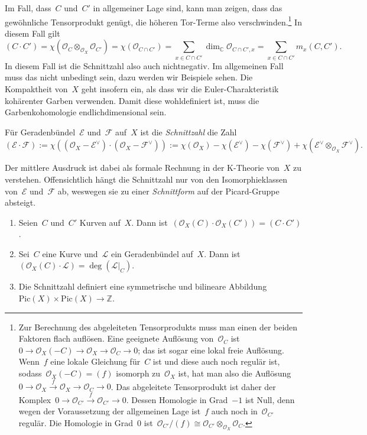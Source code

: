 \documentclass[a4paper,ngerman,12pt]{scrartcl}
\theoremstyle{definition}
\theoremstyle{plain}
\theoremstyle{remark}
\newcommand{\CC}{\mathbb{C}}
\newcommand{\ZZ}{\mathbb{Z}}
\newcommand{\E}{\mathcal{E}}
\newcommand{\F}{\mathcal{F}}
\renewcommand{\L}{\mathcal{L}}
\renewcommand{\O}{\mathcal{O}}
\newcommand{\Pic}{\mathrm{Pic}}
\begin{document}
Im Fall, dass~$C$ und~$C'$ in allgemeiner Lage sind, kann man zeigen, dass das
gewöhnliche Tensorprodukt genügt, die höheren Tor-Terme also
verschwinden.\footnote{Zur Berechnung des abgeleiteten Tensorprodukts muss man
einen der beiden Faktoren flach auflösen. Eine geeignete Auflösung von~$\O_C$
ist~$0 \to \O_X(-C) \to \O_X \to \O_C \to 0$; das ist sogar eine lokal freie
Auflösung. Wenn~$f$ eine lokale Gleichung für~$C$ ist und diese auch noch
regulär ist, sodass~$\O_X(-C) = (f)$ isomorph zu~$\O_X$ ist, hat man also die
Auflösung~$0 \to \O_X \stackrel{f}{\to} \O_X \to \O_C \to 0$. Das abgeleitete
Tensorprodukt ist daher der Komplex~$0 \to \O_{C'} \stackrel{f}{\to} \O_{C'}
\to 0$. Dessen Homologie in Grad~$-1$ ist Null, denn wegen der Voraussetzung
der allgemeinen Lage ist~$f$ auch noch in~$\O_{C'}$ regulär. Die Homologie in
Grad~$0$ ist~$\O_{C'}/(f) \cong \O_{C'} \otimes_{\O_X} \O_C$.}
In diesem Fall gilt
\[ (C \cdot C') = \chi(\O_C \otimes_{\O_X} \O_{C'}) = \chi(\O_{C \cap C'}) =
  \sum_{x \in C \cap C'} \dim_\CC \O_{C \cap C',x} =
  \sum_{x \in C \cap C'} m_x(C,C'). \]
In diesem Fall ist die Schnittzahl also auch nichtnegativ. Im allgemeinen Fall
muss das nicht unbedingt sein, dazu werden wir Beispiele sehen. Die Kompaktheit
von~$X$ geht insofern ein, als dass wir die Euler-Charakteristik kohärenter
Garben verwenden. Damit diese wohldefiniert ist, muss die Garbenkohomologie
endlichdimensional sein.

\begin{defn}Für Geradenbündel~$\E$ und~$\F$ auf~$X$ ist die \emph{Schnittzahl}
die Zahl
\[ (\E \cdot \F) :=
  \chi((\O_X - \E^\vee) \cdot (\O_X - \F^\vee)) :=
  \chi(\O_X) - \chi(\E^\vee) - \chi(\F^\vee) + \chi(\E^\vee \otimes_{\O_X}
  \F^\vee). \]
\end{defn}
Der mittlere Ausdruck ist dabei als formale Rechnung in der K-Theorie von~$X$
zu verstehen. Offensichtlich hängt die Schnittzahl nur von den
Isomorphieklassen von~$\E$ und~$\F$ ab, weswegen sie zu einer
\emph{Schnittform} auf der Picard-Gruppe absteigt.

\begin{prop}\begin{enumerate}
\item Seien~$C$ und~$C'$ Kurven auf~$X$. Dann ist~$(\O_X(C) \cdot \O_X(C')) = (C
\cdot C')$.
\item Sei~$C$ eine Kurve und~$\L$ ein Geradenbündel auf~$X$. Dann ist~$(\O_X(C)
\cdot \L) = \deg(\L|_C)$.
\item Die Schnittzahl definiert eine symmetrische und bilineare Abbildung
$\Pic(X) \times \Pic(X) \to \ZZ$.
\end{enumerate}\end{prop}
\end{document}
